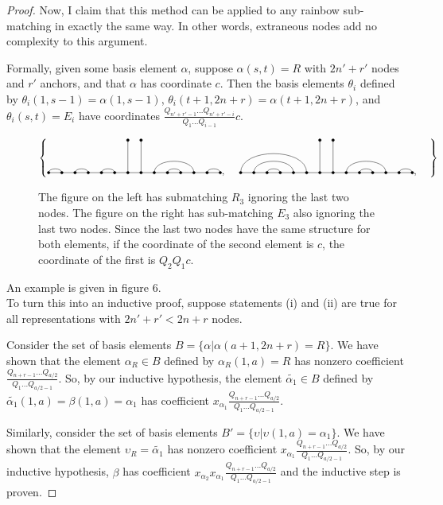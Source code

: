 \documentclass{amsart}
\begin{document}
\begin{proof}
	Now, I claim that this method can be applied to any rainbow sub-matching in exactly the same way. In other words, extraneous nodes add no complexity to this argument.
	
	Formally, given some basis element $\alpha$, suppose $\alpha(s,t)=R$ with $2n'+r'$ nodes and $r'$ anchors, and that $\alpha$ has coordinate $c$. Then the basis elements $\theta_i$ defined by $\theta_i(1,s-1)=\alpha(1,s-1)$, $\theta_i(t+1,2n+r)=\alpha(t+1,2n+r)$, and $\theta_i(s,t)=E_i$ have coordinates $\frac{Q_{n'+r'-1}...Q_{n'+r'-i}}{Q_1...Q_{i-1}}c$.
	
	\begin{figure}
		\def\cbasisspacing{5mm}
		
		$\cbr{
			\begin{gathered}
			\GeneralizedMatching{14}{1/2,3/4,5/6,9/12,10/11,13/14}{2}{7/1,8/2}{5/4}, \hspace{\cbasisspacing}
			\GeneralizedMatching{14}{1/6,2/5,3/4,9/12,10/11,13/14}{2}{7/1,8/2}{5/4}, \hspace{\cbasisspacing}
			\end{gathered}}$ 
		\caption{The figure on the left has submatching $R_3$ ignoring the last two nodes. The figure on the right has sub-matching $E_3$ also ignoring the last two nodes. Since the last two nodes have the same structure for both elements, if the coordinate of the second element is $c$, the coordinate of the first is $Q_2Q_1c$.}
	\end{figure}
	
	An example is given in figure 6.
	\\
	
	To turn this into an inductive proof, suppose statements (i) and (ii) are true for all representations with $2n'+r'<2n+r$ nodes.
	
	Consider the set of basis elements $B=\{\alpha|\alpha(a+1,2n+r)=R\}$. We have shown that the element $\alpha_R\in B$ defined by $\alpha_R(1,a)=R$ has nonzero coefficient $\frac{Q_{n+r-1}...Q_{a/2}}{Q_1...Q_{a/2-1}}$. So, by our inductive hypothesis, the element $\tilde{\alpha_1}\in B$ defined by $\tilde{\alpha_1}(1,a)=\beta(1,a)=\alpha_1$ has coefficient $x_{\alpha_1}\frac{Q_{n+r-1}...Q_{a/2}}{Q_1...Q_{a/2-1}}$.
	
	Similarly, consider the set of basis elements $B'=\{\upsilon|\upsilon(1,a)=\alpha_1\}$. We have shown that the element $\upsilon_R=\tilde{\alpha_1}$ has nonzero coefficient $x_{\alpha_1}\frac{Q_{n+r-1}...Q_{a/2}}{Q_1...Q_{a/2-1}}$. So, by our inductive hypothesis, $\beta$ has coefficient $x_{\alpha_2}x_{\alpha_1}\frac{Q_{n+r-1}...Q_{a/2}}{Q_1...Q_{a/2-1}}$ and the inductive step is proven.
	

\end{proof}
\end{document}
